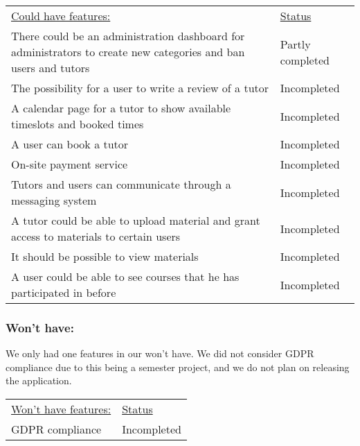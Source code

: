 \begin{table}[h]
    \begin{tabularx}{\textwidth}{|X|l|}
    \underline{Could have features:}                                                                                  & \underline{Status} \\
    There could be an administration dashboard for administrators to create new categories and ban users and tutors   & Partly completed \\
    The possibility for a user to write a review of a tutor                                                           & Incompleted \\
    A calendar page for a tutor to show available timeslots and booked times                                          & Incompleted \\
    A user can book a tutor                                                                                           & Incompleted \\
    On-site payment service                                                                                           & Incompleted \\
    Tutors and users can communicate through a messaging system                                                       & Incompleted \\
    A tutor could be able to upload material and grant access to materials to certain users                           & Incompleted \\
    It should be possible to view materials                                                                           & Incompleted \\
    A user could be able to see courses that he has participated in before                                            & Incompleted \\
\end{tabularx}
\end{table}

\subsubsection{Won't have:}
We only had one features in our won't have. 
We did not consider GDPR compliance due to this being a semester project, and we do not plan on releasing the application.
\begin{table}[h]
    \begin{tabularx}{\textwidth}{|X|l|}
    \underline{Won't have features:}                    & \underline{Status} \\
    GDPR compliance                                     & Incompleted \\
   \end{tabularx}
\end{table}
